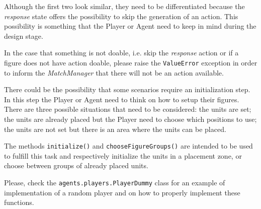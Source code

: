 \documentclass[a4paper]{report}
\begin{document}
	Although the first two look similar, they need to be differentiated because the \textit{response} state offers the possibility to skip the generation of an action. This possibility is something that the Player or Agent need to keep in mind during the design stage.

	In the case that something is not doable, i.e. skip the \textit{response} action or if a figure does not have action doable, please raise the \texttt{ValueError} exception in order to inform the \textit{MatchManager} that there will not be an action available.

	There could be the possibility that some scenarios require an initialization step. In this step the Player or Agent need to think on how to setup their figures. There are three possible situations that need to be considered: the units are set; the units are already placed but the Player need to choose which positions to use; the units are not set but there is an area where the units can be placed.

	The methods \texttt{initialize()} and \texttt{chooseFigureGroups()} are intended to be used to fulfill this task and respectively initialize the units in a placement zone, or choose between groups of already placed units.

	Please, check the \texttt{agents.players.PlayerDummy} class for an example of implementation of a random player and on how to properly implement these functions.


	{}
	
\end{document}
